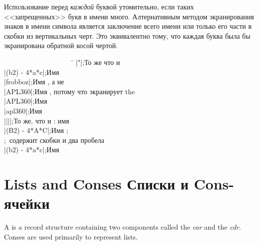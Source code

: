 Использование \cd{{\Xbackslash}} перед \emph{каждой} буквой утомительно, если
таких <<запрещенных>> букв в имени много. Алтернативным методом экранирования
знаков в имени символа является заключение всего имени или только его части в
скобки из вертикальных черт. Это эквивалентно тому, что каждая буква была бы
экранирована обратной косой чертой.
\begin{lisp}
~~~~~~~~~~~~~~~~~~~~\=\kill
|"|\>;\textrm{То же что и } \\
|(b{\Xcircumflex}2) - 4*a*c|\>;\textrm{Имя } \\
|frobboz|\>;\textrm{Имя , а не } \\
|APL{\Xbackslash}360|\>;\textrm{Имя , потому что \cd{{\Xbackslash}} экранирует the } \\
|APL{\Xbackslash}{\Xbackslash}360|\>;\textrm{Имя } \\
|apl{\Xbackslash}{\Xbackslash}360|\>;\textrm{Имя } \\
|{\Xbackslash}|{\Xbackslash}||\>;\textrm{То же, что и \cd{{\Xbackslash}|{\Xbackslash}|}: имя \cd{||}} \\
|(B{\Xcircumflex}2) - 4*A*C|\>;\textrm{Имя ;} \\
\>;~\textrm{содержит скобки и два пробела} \\
|(b{\Xcircumflex}2) - 4*a*c|\>;\textrm{Имя }
\end{lisp}


\section{Lists and Conses Списки и Cons-ячейки}

A  is a record structure containing two components
called the \emph{car} and the \emph{cdr}.  Conses are used primarily
to represent lists.

